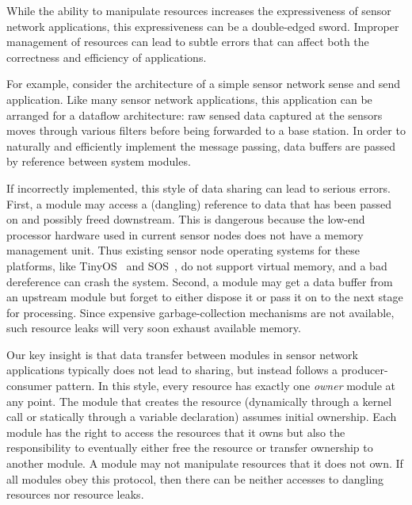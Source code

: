 While the ability to manipulate resources increases the expressiveness
of sensor network applications, this expressiveness can be a
double-edged sword.  Improper management of resources can lead to
subtle errors that can affect both the correctness and efficiency of
applications.

For example, consider the architecture of a simple sensor network
sense and send application.
Like many sensor network applications, this application can be
arranged for a dataflow architecture:  raw sensed data captured at the
sensors moves through various filters
before being forwarded to a base station.
In order to naturally and efficiently implement the message passing,
data buffers are 
passed by
reference between system modules.

If incorrectly implemented, this style of data sharing can lead to
serious errors.  First, a module may access a (dangling) reference to
data that has been passed on and possibly freed downstream. 
%
This is dangerous because
%
the low-end processor hardware used in current sensor nodes does not
have a memory management unit.  Thus existing sensor node operating
systems for these platforms, like TinyOS~\cite{TinyOS} and
SOS~\cite{sos}, do not support virtual memory, and a bad dereference
can crash the system. 
%
Second, a module may get a data buffer from an upstream module but
forget to either dispose it or pass it on to the next stage for
processing.  Since expensive garbage-collection mechanisms are not
available, such resource leaks will very soon exhaust available
memory.


Our key insight is that data transfer between
modules in sensor network applications 
typically does not lead to sharing, but instead follows a
producer-consumer pattern.  
In this style,
every resource has exactly one {\em owner} module at any point.  The
module that creates the resource (dynamically 
through a kernel call or statically
through a variable declaration) assumes initial ownership.
Each module has the right to access the resources that it owns but
also the responsibility to eventually either free the resource or transfer
ownership to another module.  
%
A module may not manipulate resources that it does not own.  If all
modules obey this protocol, then there can be neither accesses to
dangling resources nor resource leaks.



